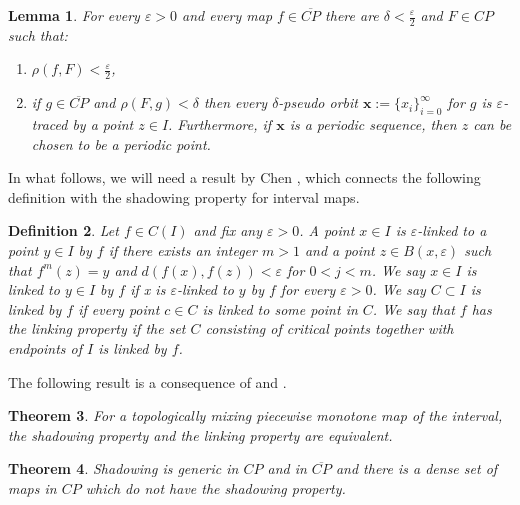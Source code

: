 \documentclass[12pt, a4paper]{amsart}
\newtheorem{theorem}{Theorem}[section]
\newtheorem{lemma}[theorem]{Lemma}
\newtheorem{definition}[theorem]{Definition}
\def\eps{\varepsilon}
\newcommand{\?}{{\bf ???}}
\def\CP{\overline{CP}}
\begin{document}
\begin{lemma}\label{lem:shadowingdense2}
For every $\eps>0$ and every map $f\in \CP$
 there are
$\delta<\frac{\eps}{2}$ and $F\in CP$ such that:
\begin{enumerate}
\item $\rho(f,F)<\frac{\eps}{2}$,
\item if $g\in \CP$ and $\rho(F,g)<\delta$ then every $\delta$-pseudo orbit $\mathbf{x}:=\{x_i\}_{i=0}^\infty$ for $g$ is $\eps$-traced by a point $z\in I$.
Furthermore, if $\mathbf{x}$ is a periodic sequence, then $z$ can be chosen to be a periodic point.
\end{enumerate}
\end{lemma}

In what follows, we will need a result by Chen \cite{Ch91}, which connects the following definition with the shadowing property for interval maps.
\begin{definition} Let $f \in C(I)$ and fix any $\eps>0$. A point $x\in I$ is {\em $\eps$-linked to a point $y\in I$ by $f$} if there exists an integer $m > 1$ and a point $z \in B(x, \eps)$ such that $f^m(z) = y$ and
$d(f(x), f(z)) <\eps$ for $0< j< m$.
We say {\em $x \in I$ is linked to $y \in I$ by $f$} if x is $\eps$-linked to $y$ by $f$ for every $\eps > 0$. We say  {\em $C\subset I$ is linked by $f$} if every point $c \in  C$ is linked to some point in $C$.
We say that $f$ has the linking property if the set $C$ consisting of critical points together with endpoints of $I$ is linked by $f$.
\end{definition}

The following result is a consequence of \cite{Ch91} and \cite{Parry}.
\begin{theorem}\label{thm:chen}
For a topologically mixing piecewise monotone map of the interval, the shadowing property and the linking  property are equivalent.
\end{theorem}


\begin{theorem}\label{thm:shadowing}
Shadowing is generic in $CP$ and in  $\CP$ and there is a dense set of maps in $CP$  which do not have the shadowing property.
\end{theorem}
\end{document}
